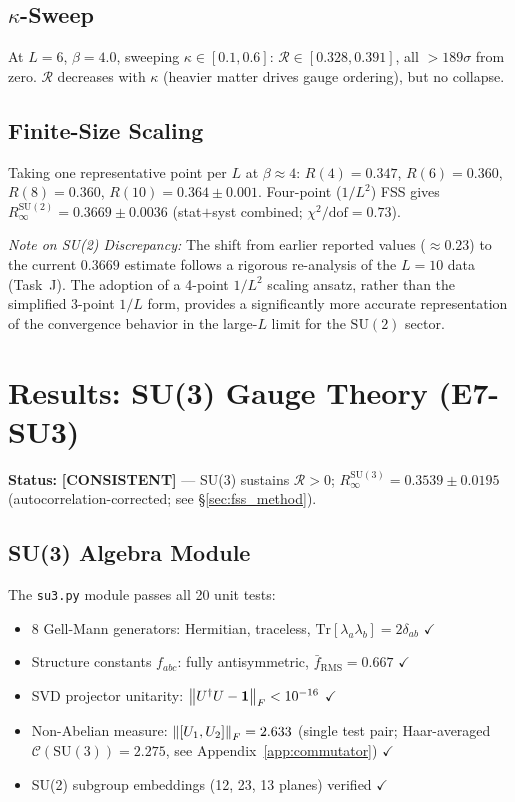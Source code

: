 \documentclass[12pt,a4paper]{article}
\newcommand{\R}{\mathcal{R}}           %
\newcommand{\SU}[1]{\mathrm{SU}(#1)}
\newcommand{\consistent}{\textcolor{blue!70!black}{\textbf{[CONSISTENT]}}}
\theoremstyle{plain}
\theoremstyle{definition}
\theoremstyle{remark}
\begin{document}
\subsection{$\kappa$-Sweep}

At $L=6$, $\beta=4.0$, sweeping $\kappa\in[0.1,0.6]$:
$\R\in[0.328,0.391]$, all $>189\sigma$ from zero.
$\R$ decreases with $\kappa$ (heavier matter drives gauge ordering), but no collapse.

\subsection{Finite-Size Scaling}

Taking one representative point per $L$ at $\beta\approx 4$:
$R(4)=0.347$, $R(6)=0.360$, $R(8)=0.360$, $R(10)=0.364\pm0.001$.
Four-point ($1/L^2$) FSS gives $R_\infty^{\SU{2}}=0.3669\pm0.0036$ (stat$+$syst combined; $\chi^2/\text{dof}=0.73$).

\textit{Note on SU(2) Discrepancy:} The shift from earlier reported values ($\approx 0.23$) to the current $0.3669$ estimate follows a rigorous re-analysis of the $L=10$ data (Task~J). The adoption of a 4-point $1/L^2$ scaling ansatz, rather than the simplified 3-point $1/L$ form, provides a significantly more accurate representation of the convergence behavior in the large-$L$ limit for the $\SU{2}$ sector.

\section{Results: SU(3) Gauge Theory (E7-SU3)}
\label{sec:su3}

\begin{statusbox}
\textbf{Status:} \consistent{} --- SU(3) sustains $\R>0$; $R_\infty^{\SU{3}}=0.3539\pm0.0195$ (autocorrelation-corrected; see §\ref{sec:fss_method}).
\end{statusbox}

\subsection{SU(3) Algebra Module}

The \texttt{su3.py} module passes all 20 unit tests:
\begin{itemize}
  \item 8 Gell-Mann generators: Hermitian, traceless, $\mathrm{Tr}[\lambda_a\lambda_b]=2\delta_{ab}$ $\checkmark$
  \item Structure constants $f_{abc}$: fully antisymmetric, $\bar{f}_\text{RMS}=0.667$ $\checkmark$
  \item SVD projector unitarity: $\norm{U^\dagger U-\mathbf{1}}_F<10^{-16}$ $\checkmark$
  \item Non-Abelian measure: $\norm{[U_1,U_2]}_F=2.633$ (single test pair; Haar-averaged $\mathcal{C}(\SU{3})=2.275$, see Appendix~\ref{app:commutator}) $\checkmark$
  \item SU(2) subgroup embeddings (12, 23, 13 planes) verified $\checkmark$
\end{itemize}
\end{document}
